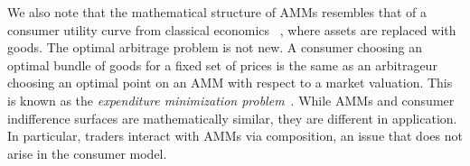 We also note that the mathematical structure of AMMs resembles that of a consumer utility curve from classical economics ~\cite{micro}, where assets are replaced with goods.
The optimal arbitrage problem is not new.
A consumer choosing an optimal bundle of goods for a fixed set of prices is the same as an arbitrageur choosing an optimal point on an AMM with respect to a market valuation.
This is known as the \emph{expenditure minimization problem}~\cite{micro}.
While AMMs and consumer indifference surfaces are mathematically similar, they are different in application.
In particular,
traders interact with AMMs via composition,
an issue that does not arise in the consumer model.
